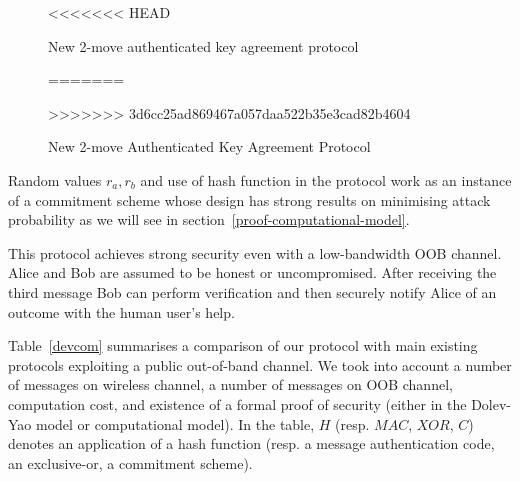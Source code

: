 \begin{figure}[b]
\begin{center}
\end{center}
<<<<<<< HEAD
\caption{New 2-move authenticated key agreement protocol} 
=======
\caption{New 2-move Authenticated Key Agreement Protocol} 
>>>>>>> 3d6cc25ad869467a057daa522b35e3cad82b4604
\label{improved-wong-stajano-protocol}
\end{figure}

Random values $r_a, r_b$ and use of hash function in the protocol work as an instance of a commitment scheme whose design has strong results on minimising attack probability as we will see in section~\ref{proof-computational-model}. 

This protocol achieves strong security even with a low-bandwidth OOB channel. Alice and Bob are assumed to be honest or uncompromised. After receiving the third message Bob can perform verification and then securely notify Alice of an outcome with the human user's help. 

Table~\ref{devcom} summarises a comparison of our protocol with main existing protocols exploiting a public out-of-band channel. We took into account a number of messages on wireless channel, a number of messages on OOB channel, computation cost, and existence of a formal proof of security (either in the Dolev-Yao model or computational model). In the table, $H$ (resp. $MAC$, $XOR$, $C$) denotes an application of a hash function (resp. a message authentication code, an exclusive-or, a commitment scheme).

